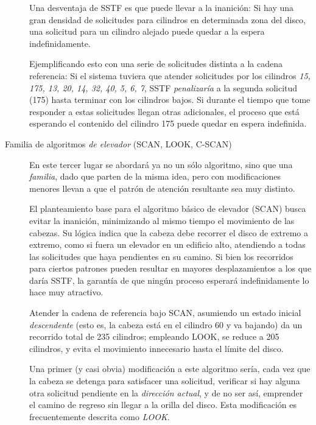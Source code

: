 \documentclass[11pt,fleqn]{book} %
\begin{document}
\begin{description}
	  Una desventaja de SSTF es que puede llevar a la inanición:
          Si hay una gran densidad de solicitudes para cilindros en
          determinada zona del disco, una solicitud para un cilindro
          alejado puede quedar a la espera
          indefinidamente.

	  Ejemplificando esto con una serie de solicitudes distinta a
          la cadena referencia: Si el sistema tuviera que atender
          solicitudes por los cilindros \emph{15, 175, 13, 20, 14, 32, 40,           5, 6, 7}, SSTF \emph{penalizaría} a la segunda solicitud (175)
          hasta terminar con los cilindros bajos. Si durante el tiempo
          que tome responder a estas solicitudes llegan otras
          adicionales, el proceso que está esperando el contenido del
          cilindro 175 puede quedar en espera indefinida.
\item[Familia de algoritmos \emph{de elevador} (SCAN, LOOK, C-SCAN)] En este
     tercer lugar se abordará ya no un sólo algoritmo, sino que una
     \emph{familia}, dado que parten de la misma idea, pero con
     modificaciones menores llevan a que el patrón de atención
     resultante sea muy distinto.

     El planteamiento base para el algoritmo básico de elevador (SCAN)
     busca evitar la inanición, minimizando al mismo tiempo el
     movimiento de las cabezas. Su lógica indica que la cabeza debe
     recorrer el disco de extremo a extremo, como si fuera un elevador
     en un edificio alto, atendiendo a todas las solicitudes que haya
     pendientes en su camino. Si bien los recorridos para ciertos
     patrones pueden resultar en mayores desplazamientos a los que
     daría SSTF, la garantía de que ningún proceso esperará
     indefinidamente lo hace muy atractivo.

     Atender la cadena de referencia bajo SCAN, asumiendo un estado
     inicial \emph{descendente} (esto es, la cabeza está en el cilindro 60
     y va bajando) da un recorrido total de 235 cilindros; empleando
     LOOK, se reduce a 205 cilindros, y evita el movimiento
     innecesario hasta el límite del disco.

     Una primer (y casi obvia) modificación a este algoritmo sería,
     cada vez que la cabeza se detenga para satisfacer una solicitud,
     verificar si hay alguna otra solicitud pendiente en la \emph{dirección      actual}, y de no ser así, emprender el camino de regreso sin
     llegar a la orilla del disco. Esta modificación es frecuentemente
     descrita como \emph{LOOK}.


\end{description}
\end{document}
